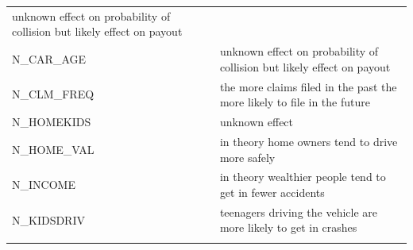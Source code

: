\documentclass[]{article}
\begin{document}
\begin{longtable}[]{@{}ll@{}}
\begin{minipage}[t]{0.76\columnwidth}
unknown effect on probability of collision but likely effect on payout
\strut\end{minipage}\tabularnewline
\begin{minipage}[t]{0.18\columnwidth}\raggedright\strut
N\_CAR\_AGE
\strut\end{minipage} &
\begin{minipage}[t]{0.76\columnwidth}\raggedright\strut
unknown effect on probability of collision but likely effect on payout
\strut\end{minipage}\tabularnewline
\begin{minipage}[t]{0.18\columnwidth}\raggedright\strut
N\_CLM\_FREQ
\strut\end{minipage} &
\begin{minipage}[t]{0.76\columnwidth}\raggedright\strut
the more claims filed in the past the more likely to file in the future
\strut\end{minipage}\tabularnewline
\begin{minipage}[t]{0.18\columnwidth}\raggedright\strut
N\_HOMEKIDS
\strut\end{minipage} &
\begin{minipage}[t]{0.76\columnwidth}\raggedright\strut
unknown effect
\strut\end{minipage}\tabularnewline
\begin{minipage}[t]{0.18\columnwidth}\raggedright\strut
N\_HOME\_VAL
\strut\end{minipage} &
\begin{minipage}[t]{0.76\columnwidth}\raggedright\strut
in theory home owners tend to drive more safely
\strut\end{minipage}\tabularnewline
\begin{minipage}[t]{0.18\columnwidth}\raggedright\strut
N\_INCOME
\strut\end{minipage} &
\begin{minipage}[t]{0.76\columnwidth}\raggedright\strut
in theory wealthier people tend to get in fewer accidents
\strut\end{minipage}\tabularnewline
\begin{minipage}[t]{0.18\columnwidth}\raggedright\strut
N\_KIDSDRIV
\strut\end{minipage} &
\begin{minipage}[t]{0.76\columnwidth}\raggedright\strut
teenagers driving the vehicle are more likely to get in crashes
\strut\end{minipage}\tabularnewline
\begin{minipage}[t]{0.18\columnwidth}\raggedright\strut

\end{minipage}
\end{longtable}
\end{document}

